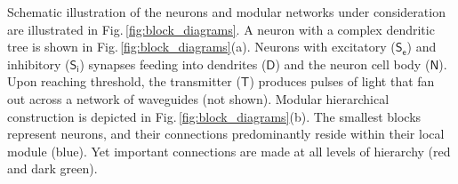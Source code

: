 \documentclass[twocolumn]{article}
\begin{document}
Schematic illustration of the neurons and modular networks under consideration are illustrated in Fig.\,\ref{fig:block_diagrams}. A neuron with a complex dendritic tree is shown in Fig.\,\ref{fig:block_diagrams}(a). Neurons with excitatory ($\mathsf{S_e}$) and inhibitory ($\mathsf{S_i}$) synapses feeding into dendrites ($\mathsf{D}$) and the neuron cell body ($\mathsf{N}$). Upon reaching threshold, the transmitter ($\mathsf{T}$) produces pulses of light that fan out across a network of waveguides (not shown). Modular hierarchical construction is depicted in Fig.\,\ref{fig:block_diagrams}(b). The smallest blocks represent neurons, and their connections predominantly reside within their local module (blue). Yet important connections are made at all levels of hierarchy (red and dark green).
\begin{figure}[t!]
\end{figure}
\end{document}

